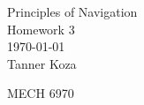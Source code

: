 \documentclass[12pt, letterpaper, onecolumn]{exam}
\begin{document}
\begingroup
\centering
\LARGE Principles of Navigation\\
\LARGE Homework 3 \\[0.5em]
\large \today\\[0.5em]
\large Tanner Koza\par
\large MECH 6970\par
\endgroup
\pointsdroppedatright
\printanswers

\renewcommand{\solution}{\noindent\textbf{Solution:}\enspace}   %

\begin{questions}

    
    \clearpage
    
    \clearpage
    
    \clearpage
    
    \clearpage
    
    \clearpage

\end{questions}





\end{document}
